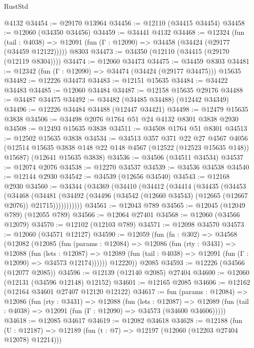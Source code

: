 \begin{lexlean}{RustStd}
\begin{coremodule}
    @4132
@34454 := @29170 @13964
@34456 := @12110 (@34415 @34454)
@34458 := @12060 (@34350 @34456)
@34459 := @34441 @4132
@34468 := @12324
    (fun (tail : @4038) => @12091 (fun (Γ : @12090) => @34458 (@34424 (@29177 (@34459 @12122)))))
    @8303
@34473 := @34350 (@12110 (@34415 (@29170 (@12119 @8304))))
@34474 := @12060 @34473
@34475 := @34459 @8303
@34481 := @12342 (fun (Γ : @12090) => @34474 (@34424 (@29177 @34475))) @15635
@34482 := @12226 @34473
@34483 := @12151 @15635
@34484 := @34422 @34483
@34485 := @12060 @34484
@34487 := @12158 @15635 @29176
@34488 := @34487 @34475
@34492 := @34482 (@34485 @34488) (@12442 @34349)
@34496 := @12226 @34484 @34488 (@12447 @34421)
@34498 := @12479 @15635 @3838
@34506 := @34498 @2076 @1764 @51 @24 @4132 @8301 @3838 @2930
@34508 := @12493 @15635 @3838
@34511 := @34508 @1764 @51 @8301
@34513 := @12502 @15635 @3838
@34534 := @34513
    @357
    @371
    @22
    @27
    @4567
    @4056
    (@12514 @15635 @3838 @148 @22 @148 @4567 (@12522 (@12523 @15635 @148)) @15687)
    (@12641 @15635 @3838)
@34536 := @34506 (@34511 @34534)
@34537 := @12074 @2076
@34538 := @12270 @34537
@34539 := @34536 @34538
@34540 := @12144 @2930
@34542 := @34539 (@12656 @34540)
@34543 := @12168 @2930
@34560 := @34344
    (@34369
      (@34410
        (@34412
          (@34414
            (@34435
              (@34453
                (@34468
                  (@34481
                    (@34492
                      (@34496 (@34542 (@12660 @34543) (@12665 (@12667 @2076)) @21715)))))))))))
@34561 := @12043 @789
@34565 := @12045 (@12049 @789) (@12055 @789)
@34566 := @12064 @27401
@34568 := @12060 (@34566 @12079)
@34570 := @12102 (@12103 @789)
@34571 := @12098 @34570
@34573 := @12060 (@34571 @12127)
@34590 := @12059
    (fun (fn : @302) =>
    @34568
      (@12082
        (@12085
          (fun (params : @12084) =>
          @12086
            (fun (rty : @3431) =>
            @12088
              (fun (lets : @12087) =>
              @12089 (fun (tail : @4038) => @12091 (fun (Γ : @12090) => @34573 @12174))))))
        @12220))
    @2085
@34593 := @12226 (@34566 (@12077 @2085))
@34596 := @12139 (@12140 @2085) @27404
@34600 := @12060 (@12131 (@34596 @12148) @12152)
@34601 := @12165 @2085
@34606 := @12162 (@12164 @34601 @27407 @12120 @12122)
@34617 := fun (params : @12084) =>
  @12086
    (fun (rty : @3431) =>
    @12088
      (fun (lets : @12087) =>
      @12089 (fun (tail : @4038) => @12091 (fun (Γ : @12090) => @34573 (@34600 @34606)))))
@34618 := @12085 @34617
@34619 := @12082 @34618
@34628 := @12188
    (fun (U : @12187) => @12189 (fun (t : @7) => @12197 (@12060 (@12203 @27404 @12078) @12214)))

\end{coremodule}
\end{lexlean}
